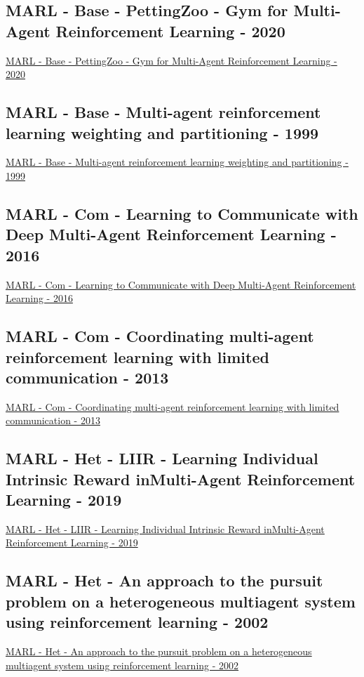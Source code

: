 \subsection{MARL - Base - PettingZoo - Gym for Multi-Agent Reinforcement Learning - 2020}
\href{https://arxiv.org/abs/2009.14471}{MARL - Base - PettingZoo - Gym for Multi-Agent Reinforcement Learning - 2020}

\subsection{MARL - Base - Multi-agent reinforcement learning weighting and partitioning - 1999}
\href{https://www.sciencedirect.com/science/article/pii/S0893608099000246}{MARL - Base - Multi-agent reinforcement learning weighting and partitioning - 1999}

\subsection{MARL - Com - Learning to Communicate with Deep Multi-Agent Reinforcement Learning - 2016}
\href{https://arxiv.org/abs/1605.06676}{MARL - Com - Learning to Communicate with Deep Multi-Agent Reinforcement Learning - 2016}

\subsection{MARL - Com - Coordinating multi-agent reinforcement learning with limited communication - 2013}
\href{https://dl.acm.org/doi/abs/10.5555/2484920.2485093}{MARL - Com - Coordinating multi-agent reinforcement learning with limited communication - 2013}

\subsection{MARL - Het - LIIR - Learning Individual Intrinsic Reward inMulti-Agent Reinforcement Learning - 2019}
\href{https://proceedings.neurips.cc/paper/2019/hash/07a9d3fed4c5ea6b17e80258dee231fa-Abstract.html}{MARL - Het - LIIR - Learning Individual Intrinsic Reward inMulti-Agent Reinforcement Learning - 2019}

\subsection{MARL - Het - An approach to the pursuit problem on a heterogeneous multiagent system using reinforcement learning - 2002}
\href{https://www.sciencedirect.com/science/article/abs/pii/S092188900300040X}{MARL - Het - An approach to the pursuit problem on a heterogeneous multiagent system using reinforcement learning - 2002}

